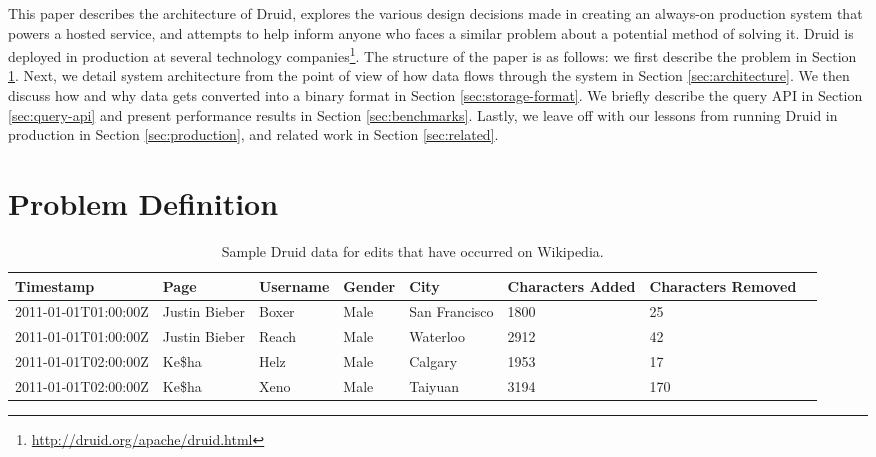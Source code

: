 \documentclass{sig-alternate-2013}
\begin{document}
This paper describes the architecture of Druid, explores the various design
decisions made in creating an always-on production system that powers a hosted
service, and attempts to help inform anyone who faces a similar problem about a
potential method of solving it. Druid is deployed in production at several
technology
companies\footnote{\href{http://druid.org/apache/druid.html}{http://druid.org/apache/druid.html}}.
The structure of the paper is as follows: we first describe the problem in
Section \ref{sec:problem-definition}. Next, we detail system architecture from
the point of view of how data flows through the system in Section
\ref{sec:architecture}. We then discuss how and why data gets converted into a
binary format in Section \ref{sec:storage-format}. We briefly describe the
query API in Section \ref{sec:query-api} and present performance results
in Section \ref{sec:benchmarks}. Lastly, we leave off with our lessons from
running Druid in production in Section \ref{sec:production}, and related work
in Section \ref{sec:related}.

\section{Problem Definition}
\label{sec:problem-definition}

\begin{table*}
  \centering
  \begin{tabular}{| l | l | l | l | l | l | l | l |}
    \hline
    \textbf{Timestamp} & \textbf{Page} & \textbf{Username} & \textbf{Gender} & \textbf{City} & \textbf{Characters Added} & \textbf{Characters Removed} \\ \hline
    2011-01-01T01:00:00Z & Justin Bieber & Boxer & Male & San Francisco & 1800 & 25 \\ \hline
    2011-01-01T01:00:00Z & Justin Bieber & Reach & Male & Waterloo & 2912 & 42 \\ \hline
    2011-01-01T02:00:00Z & Ke\$ha & Helz & Male & Calgary & 1953 & 17 \\ \hline
    2011-01-01T02:00:00Z & Ke\$ha & Xeno & Male & Taiyuan & 3194 & 170 \\ \hline
  \end{tabular}
  \caption{Sample Druid data for edits that have occurred on Wikipedia.}
  \label{tab:sample_data}
\end{table*}
\end{document}

